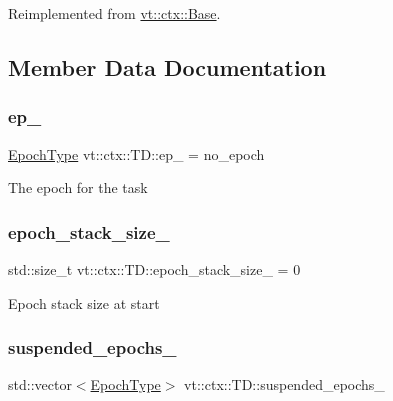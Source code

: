 Reimplemented from \hyperlink{structvt_1_1ctx_1_1_base_a445badaaad72b44313084b2c95a13003}{vt\+::ctx\+::\+Base}.



\subsection{Member Data Documentation}
\mbox{\label{structvt_1_1ctx_1_1_t_d_a27c1d8888dd9b0fcc0b6a8f31f7ebdb7}} 
\subsubsection{\texorpdfstring{ep\+\_\+}{ep\_}}
{\footnotesize\ttfamily \hyperlink{namespacevt_a985a5adf291c34a3ca263b3378388236}{Epoch\+Type} vt\+::ctx\+::\+T\+D\+::ep\+\_\+ = no\+\_\+epoch\hspace{0.3cm}{\ttfamily [private]}}

The epoch for the task \mbox{\label{structvt_1_1ctx_1_1_t_d_ac8377f072ca41920586f303b7b987823}} 
\subsubsection{\texorpdfstring{epoch\+\_\+stack\+\_\+size\+\_\+}{epoch\_stack\_size\_}}
{\footnotesize\ttfamily std\+::size\+\_\+t vt\+::ctx\+::\+T\+D\+::epoch\+\_\+stack\+\_\+size\+\_\+ = 0\hspace{0.3cm}{\ttfamily [private]}}

Epoch stack size at start \mbox{\label{structvt_1_1ctx_1_1_t_d_aa960a5f0ddf7725eb720d8bc68f1325f}} 
\subsubsection{\texorpdfstring{suspended\+\_\+epochs\+\_\+}{suspended\_epochs\_}}
{\footnotesize\ttfamily std\+::vector$<$\hyperlink{namespacevt_a985a5adf291c34a3ca263b3378388236}{Epoch\+Type}$>$ vt\+::ctx\+::\+T\+D\+::suspended\+\_\+epochs\+\_\+\hspace{0.3cm}{\ttfamily [private]}}

